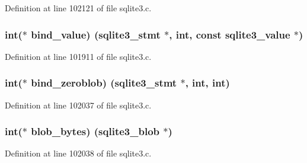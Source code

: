 Definition at line 102121 of file sqlite3.\+c.

\hypertarget{structsqlite3__api__routines_a64fdf8888afea154aed93725bd9bb1a3}{}
\subsubsection[{bind\+\_\+value}]{\setlength{\rightskip}{0pt plus 5cm}int($\ast$ bind\+\_\+value) ({\bf sqlite3\+\_\+stmt} $\ast$, int, const sqlite3\+\_\+value $\ast$)}\label{structsqlite3__api__routines_a64fdf8888afea154aed93725bd9bb1a3}


Definition at line 101911 of file sqlite3.\+c.

\hypertarget{structsqlite3__api__routines_af5f00f48cbe09e3f20da7a319dacb980}{}
\subsubsection[{bind\+\_\+zeroblob}]{\setlength{\rightskip}{0pt plus 5cm}int($\ast$ bind\+\_\+zeroblob) ({\bf sqlite3\+\_\+stmt} $\ast$, int, int)}\label{structsqlite3__api__routines_af5f00f48cbe09e3f20da7a319dacb980}


Definition at line 102037 of file sqlite3.\+c.

\hypertarget{structsqlite3__api__routines_a6eb0457daa03438d90456f349727307c}{}
\subsubsection[{blob\+\_\+bytes}]{\setlength{\rightskip}{0pt plus 5cm}int($\ast$ blob\+\_\+bytes) ({\bf sqlite3\+\_\+blob} $\ast$)}\label{structsqlite3__api__routines_a6eb0457daa03438d90456f349727307c}


Definition at line 102038 of file sqlite3.\+c.

\hypertarget{structsqlite3__api__routines_aa34d89a77100af517c61cdb4b49ecec8}{}
